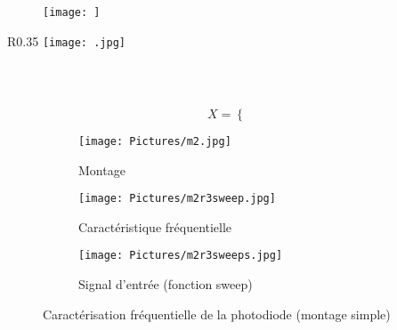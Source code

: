 \begin{figure}
	\centering
	\texttt{[image: ]}
	\caption{}
	\label{fig:}
\end{figure}

\begin{wrapfigure}{R}{0.35\textwidth}
\texttt{[image: .jpg]}
\vspace{-5pt}
\end{wrapfigure}

\begin{}[leftmargin=1cm,itemsep=0.3cm, topsep=0cm]
    \item 
	\item \\
\end{}

\begin{center}  
	\begin{tabular}{}
		
	\end{tabular}
\end{center}

$$
X = \left\{
    \begin{array}{ll}
        
    \end{array}
\right.
$$

\begin{figure}[h]
    \centering
    \subfloat[caption]{
        \centering
        \texttt{[image: ]}
        \label{fig:}
    }
	\subfloat[]{
		\centering
        \texttt{[image: ]}
        \label{fig:}
    }
	\caption{}
\end{figure}


\begin{figure}[h]
    \centering
    \begin{subfigure}[b]{0.28\textwidth}
        \centering
        \texttt{[image: Pictures/m2.jpg]}
        \caption{Montage}
    \end{subfigure}
	\begin{subfigure}[b]{0.28\textwidth}
		\centering
		\texttt{[image: Pictures/m2r3sweep.jpg]}
        \caption{Caractéristique fréquentielle}
	\end{subfigure}
	\begin{subfigure}[b]{0.28\textwidth}
		\centering
		\texttt{[image: Pictures/m2r3sweeps.jpg]}
        \caption{Signal d'entrée (fonction sweep)}
	\end{subfigure}
	\caption{Caractérisation fréquentielle de la photodiode (montage simple)}
	
\end{figure}


